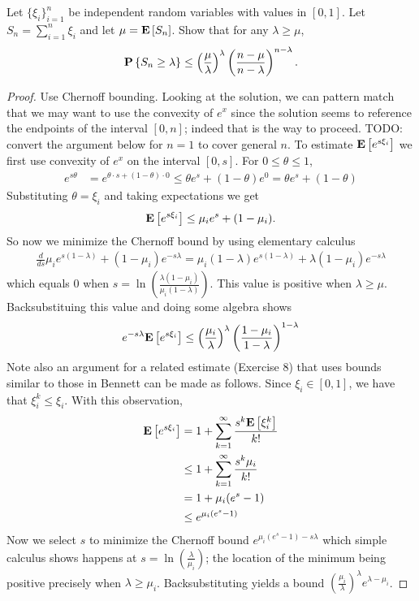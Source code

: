 \begin{lem} Let $\{\xi_i\}_{i=1}^n$ be independent
  random variables with values in $[0,1]$.  Let $S_n = \sum_{i=1}^n
  \xi_i$ and let $\mu=\textbf{E}\left[S_n\right]$.  Show that for any
  $\lambda\geq \mu$,
\begin{align*}
\textbf{P}\left \{S_n \geq \lambda \right \} \leq
\left(\frac{\mu}{\lambda}\right)^\lambda \left(\frac{n-\mu}{n-\lambda}\right)^{n-\lambda}.
\end{align*}
\end{lem}
\begin{proof}
Use Chernoff bounding.  Looking at the solution, we can pattern match
that we may want to use the convexity of $e^x$ since the solution
seems to reference the endpoints of the interval $[0,n]$; indeed that
is the way to proceed.  TODO: convert the argument below for $n=1$ to
cover general $n$.
To estimate $\textbf{E}\left[e^{s\xi_i}\right]$ we first use convexity of
$e^{x}$ on the interval $[0,s]$.  For $0 \leq \theta \leq 1$,
\begin{align*}
e^{s\theta} &= e^{\theta \cdot s + (1-\theta) \cdot 0}  \leq \theta e^s + (1-\theta)e^0 = \theta e^s + (1-\theta)
\end{align*}
Substituting $\theta=\xi_i$ and taking expectations we get
\begin{align*}
\textbf{E}\left[e^{s\xi_i}\right] \leq \mu_i e^s + (1-\mu_i).
\end{align*}
So now we minimize the Chernoff bound by using elementary calculus
\begin{align*}
\frac{d}{ds} \mu_i e^{s(1-\lambda)} + (1-\mu_i)e^{-s\lambda} = \mu_i
(1-\lambda) e^{s(1-\lambda)} + \lambda (1-\mu_i)e^{-s\lambda} 
\end{align*}
which equals $0$ when
$s=\ln\left(\frac{\lambda(1-\mu_i)}{\mu_i(1-\lambda)}\right)$.  This
value is positive when $\lambda \geq \mu$.
Backsubstituing this value and doing some algebra shows
\begin{align*}
e^{-s\lambda}\textbf{E}\left[e^{s\xi_i}\right] \leq
\left(\frac{\mu_i}{\lambda}\right)^\lambda
\left(\frac{1-\mu_i}{1-\lambda}\right)^{1-\lambda}
\end{align*}
Note also an argument for a related estimate (Exercise 8) that uses bounds similar to those in Bennett can be made
as follows.  Since $\xi_i \in [0,1]$, we have that $\xi_i^k \leq
\xi_i$.  With this observation, 
\begin{align*}
\textbf{E}\left[e^{s\xi_i}\right] &= 1 + \sum_{k=1}^\infty \frac{s^k
  \textbf{E}\left[\xi_i^k\right]}{k!} \\
& \leq 1 + \sum_{k=1}^\infty \frac{s^k \mu_i}{k!} \\
&= 1 + \mu_i (e^s -1) \\
&\leq e^{\mu_i(e^s - 1)}
\end{align*}
Now we select $s$ to minimize the Chernoff bound $e^{\mu_i(e^s - 1)
  -s\lambda}$ which simple calculus shows happens at
$s=\ln\left(\frac{\lambda}{\mu_i}\right)$; the location of the minimum
being positive precisely when $\lambda \geq \mu_i$.  Backsubstituting
yields a bound $\left(\frac{\mu_i}{\lambda}\right)^\lambda e^{\lambda
  - \mu_i}$.
\end{proof}


